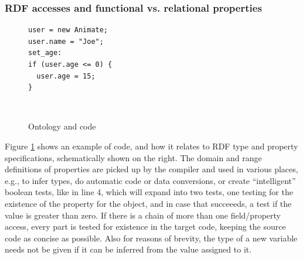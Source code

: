 \subsubsection{RDF accesses and functional vs. relational properties}
\label{sec:rdfaccesses}

\begin{figure}[htb]
\begin{minipage}{0.5\columnwidth}
\small%
\begin{verbatim}
user = new Animate;
user.name = "Joe";
set_age:
if (user.age <= 0) {
  user.age = 15;
}
\end{verbatim}
\end{minipage}\ \vrule\hspace{1ex}
\begin{minipage}{0.44\columnwidth}
    \small{}
\end{minipage}
  \caption{Ontology and \vonda code}
  \label{fig:rdfobjects}
\end{figure}

Figure \ref{fig:rdfobjects} shows an example of \vonda code, and how it relates
to RDF type and property specifications, schematically shown on the right.  The
domain and range definitions of properties are picked up by the compiler and
used in various places, e.g., to infer types, do automatic code or data
conversions, or create ``intelligent'' boolean tests, like in line 4, which
will expand into two tests, one testing for the existence of the property for
the object, and in case that succeeeds, a test if the value is greater than
zero. If there is a chain of more than one field/property access, every part is
tested for existence in the target code, keeping the source code as concise as
possible. Also for reasons of brevity, the type of a new variable needs not be
given if it can be inferred from the value assigned to it.

